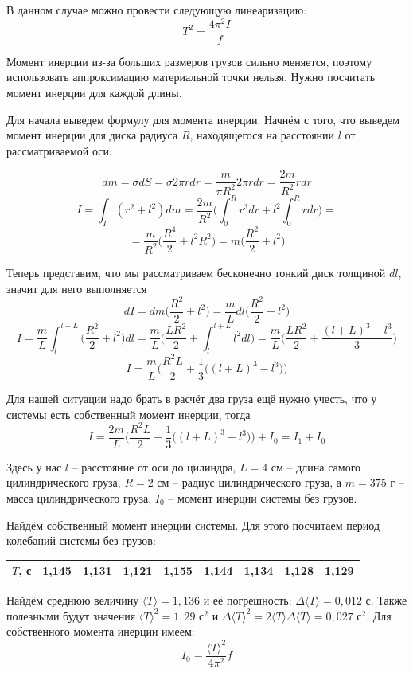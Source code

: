\documentclass[a4paper, 12pt]{article} %
\begin{document}
В данном случае можно провести следующую линеаризацию:
\[T^2 = \frac{4\pi^2 I}{f}\]

Момент инерции из-за больших размеров грузов сильно меняется, поэтому использовать аппроксимацию материальной точки нельзя. Нужно посчитать момент инерции для каждой длины. 

Для начала выведем формулу для момента инерции. Начнём с того, что выведем момент инерции для диска радиуса $R$, находящегося на расстоянии $l$ от рассматриваемой оси:

\[dm = \sigma dS = \sigma 2\pi r dr = \frac{m}{\pi R^2} 2\pi r dr = \frac{2m}{R^2} r dr\]
\[I = \int_{I} (r^2 + l^2) dm = \frac{2m}{R^2}\Big(\int_{0}^{R} r^3 dr + l^2\int_{0}^{R} r dr \Big) = \]
\[= \frac{m}{R^2}\Big(\frac{R^4}{2} + l^2 R^2 \Big) = m\Big(\frac{R^2}{2} + l^2 \Big)\]

Теперь представим, что мы рассматриваем бесконечно тонкий диск толщиной $dl$, значит для него выполняется
\[dI = dm\Big(\frac{R^2}{2} + l^2 \Big) = \frac{m}{L} dl\Big(\frac{R^2}{2} + l^2 \Big) \]
\[I = \frac{m}{L} \int_{l}^{l+L} \Big(\frac{R^2}{2} + l^2 \Big) dl = \frac{m}{L} \Big(\frac{L R^2}{2} + \int_{l}^{l+L} l^2 dl \Big) = \frac{m}{L} \Big(\frac{L R^2}{2} + \frac{(l+L)^3 - l^3}{3} \Big) \]
\[I = \frac{m}{L}\Big(\frac{R^2 L}{2} + \frac{1}{3}\big((l + L)^3 - l^3\big)\big)\]

Для нашей ситуации надо брать в расчёт два груза  ещё нужно учесть, что у системы есть собственный момент инерции, тогда
\[I = \frac{2m}{L}\Big(\frac{R^2 L}{2} + \frac{1}{3}\big((l + L)^3 - l^3\big)\big) +  I_0 = I_1 + I_0\]

Здесь у нас $l$ -- расстояние от оси до цилиндра, $L = 4$ см -- длина самого цилиндрического груза, $R = 2$ см -- радиус цилиндрического груза, а $m = 375$ г -- масса цилиндрического груза, $I_0$ -- момент инерции системы без грузов.

Найдём собственный момент инерции системы. Для этого посчитаем период колебаний системы без грузов:

\begin{center}
\begin{tabular}{|c|c|c|c|c|c|c|c|c|}
\hline 
$T$, с & 1,145 & 1,131 & 1,121 & 1,155 & 1,144 & 1,134 & 1,128 & 1,129 \\ 
\hline 
\end{tabular}
\end{center} 

Найдём среднюю величину $\langle T \rangle = 1,136$ и её погрешность: $\Delta \langle T \rangle = 0,012$ с. Также полезными будут значения $\langle T \rangle^2 = 1,29 \text{ с}^2$ и $\Delta \langle T \rangle^2 = 2 \langle T \rangle \Delta \langle T \rangle  = 0,027 \text{ с}^2$. Для собственного момента инерции имеем:
\[I_0 = \frac{\langle T \rangle^2}{4\pi^2}f\]
\end{document}
